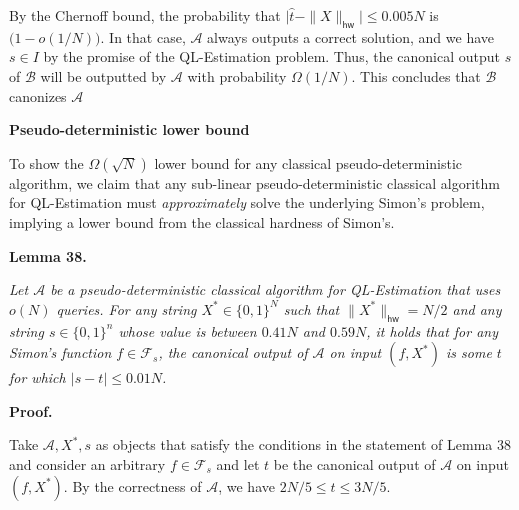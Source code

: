 \documentclass[10pt,a4paper]{article}
\begin{document}
By the Chernoff bound, the probability that $\big|\hat{t}-\|X\|_{\mathsf{hw}}\big|\leq 0.005N$ is $\big(1-o(1/N)\big)$. In that case, $\mathcal{A}$ always outputs a correct solution, and we have $s\in I$ by the promise of the QL-Estimation problem.
Thus, the canonical output $s$ of $\mathcal{B}$ will be outputted by $\mathcal{A}$ with probability $\Omega(1/N)$. This concludes that $\mathcal{B}$ canonizes $\mathcal{A}$\par





\par\medskip\noindent\textbf{Pseudo-deterministic lower bound}\par




To show the $\Omega(\sqrt{N})$ lower bound for any classical pseudo-deterministic algorithm, we claim that any sub-linear pseudo-deterministic classical algorithm for QL-Estimation must \emph{approximately} solve the underlying Simon’s problem, implying a lower bound from the classical hardness of Simon’s.\par





\par\medskip\noindent\textbf{
\textbf{Lemma 38}\textbf{.}
}\par



\emph{Let $\mathcal{A}$ be a pseudo-deterministic classical algorithm for QL-Estimation that uses $o(N)$ queries. For any string $X^{*}\in\{0,1\}^{N}$ such that $\|X^{*}\|_{\mathsf{hw}}=N/2$ and any string $s\in\{0,1\}^{n}$ whose value is between $0.41N$ and $0.59N$, it holds that for any Simon’s function $f\in\mathcal{F}_{s}$, the canonical output of $\mathcal{A}$ on input $(f,X^{*})$ is some $t$ for which $|s-t|\leq 0.01N$.}\par






\par\medskip\noindent\textbf{Proof.}\par




Take $\mathcal{A},X^{*},s$ as objects that satisfy the conditions in the statement of Lemma 38 and consider an arbitrary $f\in\mathcal{F}_{s}$ and let $t$ be the canonical output of $\mathcal{A}$ on input $(f,X^{*})$. By the correctness of $\mathcal{A}$, we have $2N/5\leq t\leq 3N/5$.\par
\end{document}
